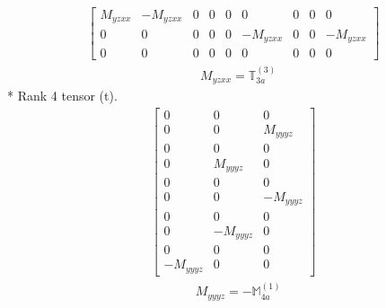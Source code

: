 \documentclass[fleqn,8pt,landscape]{jsarticle}
\begin{document}
\begin{align*}
\begin{bmatrix} M_{yzxx} & - M_{yzxx} & 0 & 0 & 0 & 0 & 0 & 0 & 0 \\ 0 & 0 & 0 & 0 & 0 & - M_{yzxx} & 0 & 0 & - M_{yzxx} \\ 0 & 0 & 0 & 0 & 0 & 0 & 0 & 0 & 0 \end{bmatrix}
\end{align*}
\begin{align*}
& M_{yzxx} = \mathbb{T}_{3a}^{(3)}
\end{align*}
* Rank 4 tensor (t).
\begin{align*}
\begin{bmatrix} 0 & 0 & 0 \\ 0 & 0 & M_{yyyz} \\ 0 & 0 & 0 \\ 0 & M_{yyyz} & 0 \\ 0 & 0 & 0 \\ 0 & 0 & - M_{yyyz} \\ 0 & 0 & 0 \\ 0 & - M_{yyyz} & 0 \\ 0 & 0 & 0 \\ - M_{yyyz} & 0 & 0 \end{bmatrix}
\end{align*}
\begin{align*}
& M_{yyyz} = - \mathbb{M}_{4a}^{(1)}
\end{align*}
\end{document}
